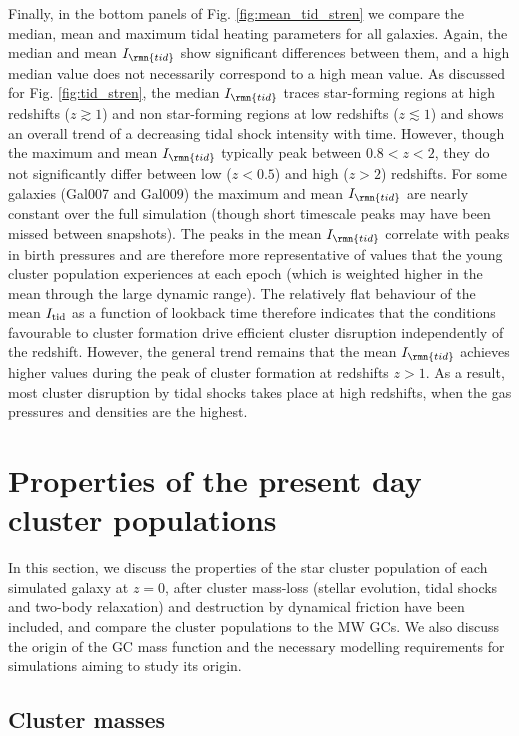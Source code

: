 \documentclass[fleqn,usenatbib]{mnras}
\begin{document}
Finally, in the bottom panels of Fig. \ref{fig:mean_tid_stren} we compare the median, mean and maximum tidal heating parameters for all galaxies. Again, the median and mean $I_\rmn{tid}$ show significant differences between them, and a high median value does not necessarily correspond to a high mean value. As discussed for Fig. \ref{fig:tid_stren}, the median $I_\rmn{tid}$ traces star-forming regions at high redshifts ($z\gtrsim1$) and non star-forming regions at low redshifts ($z\lesssim 1$) and shows an overall trend of a decreasing tidal shock intensity with time. 
However, though the maximum and mean $I_\rmn{tid}$ typically peak between $0.8<z<2$, they do not significantly differ between low ($z<0.5$) and high ($z>2$) redshifts. For some galaxies (Gal007 and Gal009) the maximum and mean $I_\rmn{tid}$ are nearly constant over the full simulation (though short timescale peaks may have been missed between snapshots).
The peaks in the mean $I_\rmn{tid}$ correlate with peaks in birth pressures and are therefore more representative of values that the young cluster population experiences at each epoch (which is weighted higher in the mean through the large dynamic range). The relatively flat behaviour of the mean $I_{\rm tid}$ as a function of lookback time therefore indicates that the conditions favourable to cluster formation drive efficient cluster disruption independently of the redshift. However, the general trend remains that the mean $I_\rmn{tid}$ achieves higher values during the peak of cluster formation at redshifts $z>1$. As a result, most cluster disruption by tidal shocks takes place at high redshifts, when the gas pressures and densities are the highest.



\section{Properties of the present day cluster populations} \label{sec:cluster_props}

In this section, we discuss the properties of the star cluster population of each simulated galaxy at $z=0$, after cluster mass-loss (stellar evolution, tidal shocks and two-body relaxation) and destruction by dynamical friction have been included, and compare the cluster populations to the MW GCs. We also discuss the origin of the GC mass function and the necessary modelling requirements for simulations aiming to study its origin.

\subsection{Cluster masses}
\end{document}
